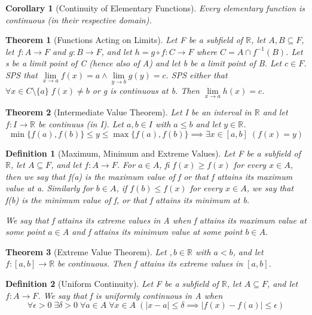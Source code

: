 \documentclass[11pt, oneside]{book}
\theoremstyle{break}
\newtheorem{thm}{Theorem}[section]
\newtheorem{crly}{Corollary}[thm]
\newtheorem{defn}{Definition}[section]
\newcommand{\bb}[1]{\mathbb{#1}}		%
\begin{document}
\begin{crly}[Continuity of Elementary Functions]
	Every elementary function is continuous (in their respective domain).
\end{crly}

\begin{thm}[Functions Acting on Limits]
	Let F be a subfield of $\bb{R}$, let $A, B \subseteq F$, let $f: A \to F$ and $g: B \to F$, and let $h = g \circ f : C \to F$ where $C = A \cap f^{-1}(B)$. Let s be a limit point of C (hence also of A) and let b be a limit point of B. Let $c \in F$. SPS that $\lim\limits_{x \to a} f(x) = a \land \lim\limits_{y \to b} g(y) = c$. SPS either that $\forall x \in C \setminus \{a\} \; f(x) \neq b$ or g is continuous at b. Then $\lim\limits_{x \to a} h(x) = c$.
\end{thm}

\begin{thm}[Intermediate Value Theorem]
	Let I be an interval in $\bb{R}$ and let $f: I \to \bb{R}$ be continuus (in I). Let $a, b \in I$ with $a \leq b$ and let $y \in \bb{R}$.
	\[
		\min \{f(a), f(b)\} \leq y \leq \max \{f(a), f(b)\} \implies \exists x \in [a, b] \; (f(x) = y)
	\]
\end{thm}

\begin{defn}[Maximum, Minimum and Extreme Values]
	Let F be a subfield of $\bb{R}$, let $A \subseteq F$, and let $f: A \to F$. For $a \in A$, fi $f(x) \geq f(x)$ for every $x \in A$, then we say that f(a) is the maximum value of f or that f attains its maximum value at a. Similarly for $b \in A$, if $f(b) \leq f(x)$ for every $x \in A$, we say that f(b) is the minimum value of f, or that f attains its minimum at b.

	We say that f attains its extreme values in A when f attains its maximum value at some point $a \in A$ and f attains its minimum value at some point $b \in A$.
\end{defn}

\begin{thm}[Extreme Value Theorem]\label{EVT}
	Let $, b \in \bb{R}$ with $a < b$, and let $f: [a, b] \to \bb{R}$ be continuous. Then f attains its extreme values in $[a, b]$.
\end{thm}

\begin{defn}[Uniform Continuity]
	Let F be a subfield of $\bb{R}$, let $A \subseteq F$, and let $f: A \to F$. We say that f is uniformly continuous in A when
	\[
		\forall \epsilon > 0 \; \exists \delta > 0 \; \forall a \in A \; \forall x \in A \; (|x - a| \leq \delta \implies |f(x) - f(a)| \leq \epsilon)
	\]
\end{defn}
\end{document}
